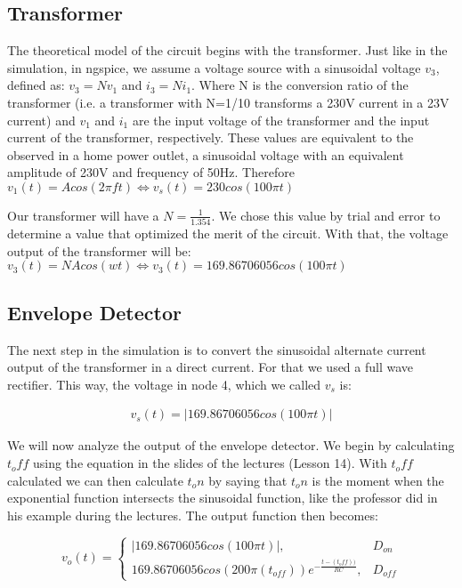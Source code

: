 \subsection{Transformer}
\hspace{12pt} The theoretical model of the circuit begins with the transformer. Just like in the simulation, in ngspice, we assume a voltage source with a sinusoidal voltage $v_3$, defined as: $v_3 = Nv_1$ and $i_3 = Ni_1$.
Where N is the conversion ratio of the transformer (i.e. a transformer with N=1/10 transforms a 230V current in a 23V current) and $v_1$ and $i_1$ are the input voltage of the transformer and the input current of the transformer, respectively. These values are equivalent to the observed in a home power outlet, a sinusoidal voltage with an equivalent amplitude of 230V and frequency of 50Hz. Therefore $v_1(t) = Acos(2\pi ft) \iff v_s(t) = 230cos(100\pi t)$

Our transformer will have a $N=\frac{1}{1.354}$. We chose this value by trial and error to determine a value that optimized the merit of the circuit. With that, the voltage output of the transformer will be: $v_3(t) = NAcos(wt) \iff v_3(t) = 169.86706056cos(100\pi t)$

\subsection{Envelope Detector}
\hspace{12pt}The next step in the simulation is to convert the sinusoidal alternate current output of the transformer in a direct current. For that we used a full wave rectifier. This way, the voltage in node 4, which we called $v_s$ is:

\vspace{-15pt}
\begin{gather}
    v_s(t) = |169.86706056cos(100\pi t)| \nonumber
\end{gather}

We will now analyze the output of the envelope detector. We begin by calculating $t_off$ using the equation in the slides of the lectures (Lesson 14). With $t_off$ calculated we can then calculate $t_on$ by saying that $t_on$ is the moment when the exponential function intersects the sinusoidal function, like the professor did in his example during the lectures. The output function then becomes:

\vspace{-8pt}
\[ 
v_o(t)= \left.
\begin{cases} 
	|169.86706056cos(100\pi t)|, & D_{on} \\
	169.86706056cos(200\pi (t_{off}))e^{-\frac{t-(t_off))}{RC}}, & D_{off}
\end{cases}
\right.
\]


